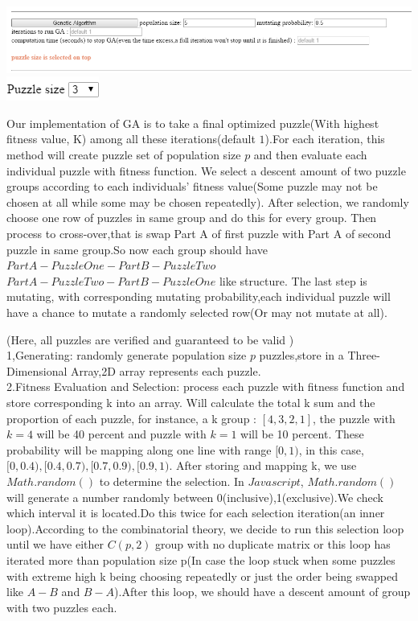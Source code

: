 \documentclass[12pt, letterpaper]{article}
\begin{document}
	\includegraphics[scale=0.6]{"Task 7/GA-section"}
	\includegraphics[scale=0.6]{"Task 7/Puzzle-size"}\\
	
	\begin{large}
		Our implementation of GA is to take a final optimized puzzle(With highest fitness value, K) among all these iterations(default $1$).For each iteration, this method will create puzzle set of population size  $p$ and then evaluate each individual puzzle with fitness function. We select a descent amount of two puzzle groups according to each individuals' fitness value(Some puzzle may not be chosen at all while some may be chosen repeatedly). After selection, we randomly choose one row of puzzles in same group and do this for every group. Then process to cross-over,that is swap Part A of first puzzle with Part A of second puzzle in same group.So now each group should have $PartA-PuzzleOne-PartB-PuzzleTwo$ $PartA-PuzzleTwo-PartB-PuzzleOne$ like structure. The last step is mutating, with corresponding mutating probability,each individual puzzle will have a chance to mutate a randomly selected row(Or may not mutate at all).
	\end{large}
	
	
	(Here, all puzzles are verified and guaranteed to be valid )\\
	
	1,Generating: randomly generate population size $p$ puzzles,store in a Three-Dimensional Array,2D array represents each puzzle.\\
	
	2.Fitness Evaluation and Selection: process each puzzle with fitness function and store corresponding k into an array. Will calculate the total k sum and the proportion of each puzzle, for instance, a k group : $[4,3,2,1]$, the puzzle with ${k=4}$ will be 40 percent and puzzle with $k=1$ will be 10 percent. These probability will be mapping along one line with range $[0,1)$, in this case,$[0,0.4),[0.4,0.7),[0.7,0.9),[0.9,1)$. After storing and mapping k, we use $Math.random()$ to determine the selection. In $Javascript$, $Math.random()$ will generate a number randomly between 0(inclusive),1(exclusive).We check which interval it is located.Do this twice for each selection iteration(an inner loop).According to the combinatorial theory, we decide to run this selection loop until we have either $C(p,2)$ group with no duplicate matrix or this loop has iterated more than population size p(In case the loop stuck when some puzzles with extreme high k being choosing repeatedly or just the order being swapped like $A-B$ and $B-A$).After this loop, we should have a descent amount of group with two puzzles each.\\
	
\end{document}
